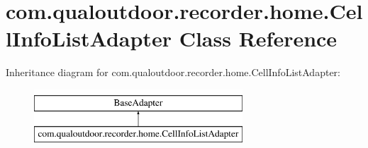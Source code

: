 \hypertarget{classcom_1_1qualoutdoor_1_1recorder_1_1home_1_1CellInfoListAdapter}{\section{com.\-qualoutdoor.\-recorder.\-home.\-Cell\-Info\-List\-Adapter Class Reference}
\label{classcom_1_1qualoutdoor_1_1recorder_1_1home_1_1CellInfoListAdapter}
}
Inheritance diagram for com.\-qualoutdoor.\-recorder.\-home.\-Cell\-Info\-List\-Adapter\-:\begin{figure}[H]
\begin{center}
\leavevmode
\includegraphics[height=2.000000cm]{classcom_1_1qualoutdoor_1_1recorder_1_1home_1_1CellInfoListAdapter}
\end{center}
\end{figure}
